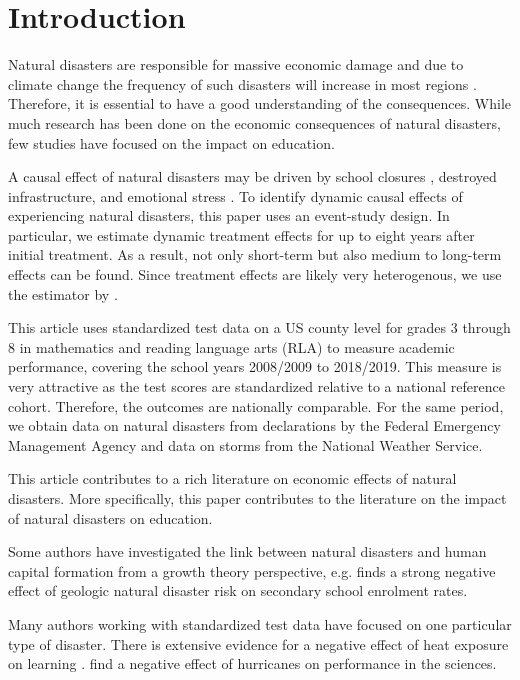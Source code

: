 
\section{Introduction}

Natural disasters are responsible for massive economic damage and due to climate change the frequency of such disasters will increase in most regions \citep{IPCC_2021}. Therefore, it is essential to have a good understanding of the consequences. While much research has been done on the economic consequences of natural disasters, few studies have focused on the impact on education.

A causal effect of natural disasters may be driven by school closures \citep{Grewening_2020}, destroyed infrastructure, and emotional stress \citep{Vogel_2016}. To identify dynamic causal effects of experiencing natural disasters, this paper uses an event-study design. In particular, we estimate dynamic treatment effects for up to eight years after initial treatment. As a result, not only short-term but also medium to long-term effects can be found. Since treatment effects are likely very heterogenous, we use the estimator by \cite{Sun_2021}. 

This article uses standardized test data on a US county level for grades 3 through 8 in mathematics and reading language arts (RLA) to measure academic performance, covering the school years 2008/2009 to 2018/2019. This measure is very attractive as the test scores are standardized relative to a national reference cohort. Therefore, the outcomes are nationally comparable. For the same period, we obtain data on natural disasters from declarations by the Federal Emergency Management Agency and data on storms from the National Weather Service.

This article contributes to a rich literature on economic effects of natural disasters. More specifically, this paper contributes to the literature on the impact of natural disasters on education.

Some authors have investigated the link between natural disasters and human capital formation from a growth theory perspective, e.g. \cite{Cuaresma_2010} finds a strong negative effect of geologic natural disaster risk on secondary school enrolment rates. 

Many authors working with standardized test data have focused on one particular type of disaster. There is extensive evidence for a negative effect of heat exposure on learning \cite[e.g.][]{Goodman_2020, Park_2020}. \cite{Spencer_2016} find a negative effect of hurricanes on performance in the sciences.

